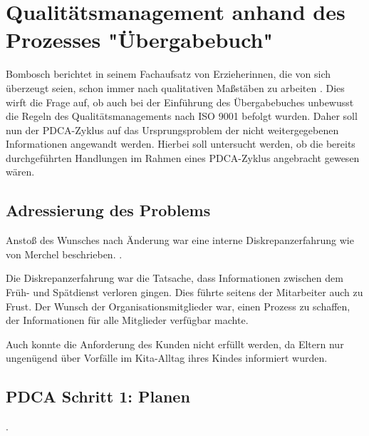 \newpage
\section{Qualitätsmanagement anhand des Prozesses "{}Übergabebuch"{}}

Bombosch berichtet in seinem Fachaufsatz von Erzieherinnen, die von sich überzeugt seien, schon immer nach qualitativen Maßstäben zu arbeiten \citep[vgl.][197]{KitaMana}. 
Dies wirft die Frage auf, ob auch bei der Einführung des Übergabebuches unbewusst die Regeln des Qualitätsmanagements nach ISO 9001 befolgt wurden. Daher soll nun der PDCA-Zyklus auf das Ursprungsproblem der nicht weitergegebenen Informationen angewandt werden. Hierbei soll untersucht werden, ob die bereits durchgeführten Handlungen im Rahmen eines PDCA-Zyklus angebracht gewesen wären.

\subsection{Adressierung des Problems}

Anstoß des Wunsches nach Änderung war eine interne Diskrepanzerfahrung wie von Merchel beschrieben.  \citep[][19]{Merchel2005}.

Die Diskrepanzerfahrung war die Tatsache, dass Informationen zwischen dem Früh- und Spätdienst verloren gingen. Dies führte seitens der Mitarbeiter auch zu Frust. Der Wunsch der Organisationsmitglieder war, einen Prozess zu schaffen, der Informationen für alle Mitglieder verfügbar machte. 

Auch konnte die Anforderung des Kunden \citep[vgl.][22]{ISO9001} nicht erfüllt werden, da Eltern nur ungenügend über Vorfälle im Kita-Alltag ihres Kindes informiert wurden.

\subsection{PDCA Schritt 1: Planen}
\citep[][23]{ISO9001}.

